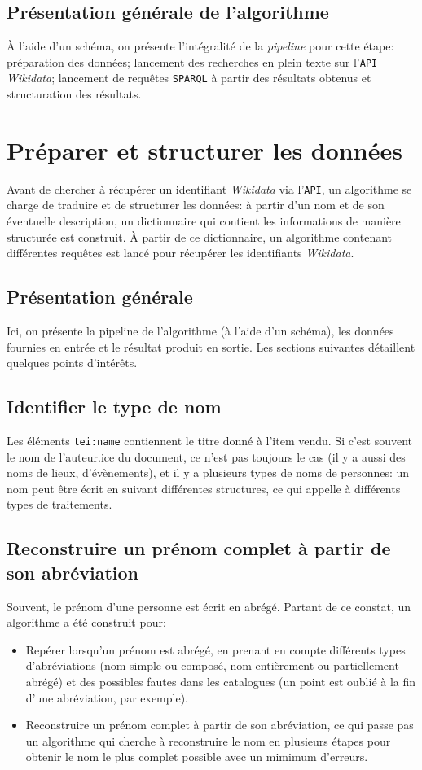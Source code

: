 \documentclass[a4paper, 12pt, twoside]{book}
\newcommand{\api}{\texttt{API}}
\newcommand{\sparql}{\texttt{SPARQL}}
\newcommand{\wkd}{\textit{Wikidata}}
\begin{document}
\subsection{Présentation générale de l'algorithme}
À l'aide d'un schéma, on présente l'intégralité de la \textit{pipeline} pour cette étape: préparation des données; lancement des recherches en plein texte sur l'\api{} \wkd{}; lancement de requêtes \sparql{} à partir des résultats obtenus et structuration des résultats. 

\section{Préparer et structurer les données}
Avant de chercher à récupérer un identifiant \wkd{} via l'\api{}, un algorithme se charge de traduire et de structurer les données: à partir d'un nom et de son éventuelle description, un dictionnaire qui contient les informations de manière structurée est construit. À partir de ce dictionnaire, un algorithme contenant différentes requêtes est lancé pour récupérer les identifiants \wkd{}.

\subsection{Présentation générale}
Ici, on présente la pipeline de l'algorithme (à l'aide d'un schéma), les données fournies en entrée et le résultat produit en sortie. Les sections suivantes détaillent quelques points d'intérêts.

\subsection{Identifier le type de nom}
Les éléments \texttt{tei:name} contiennent le titre donné à l'item vendu. Si c'est souvent le nom de l'auteur.ice du document, ce n'est pas toujours le cas (il y a aussi des noms de lieux, d'évènements), et il y a plusieurs types de noms de personnes: un nom peut être écrit en suivant différentes structures, ce qui appelle à différents types de traitements.

\subsection{Reconstruire un prénom complet à partir de son abréviation}
Souvent, le prénom d'une personne est écrit en abrégé. Partant de ce constat, un algorithme a été construit pour:
\begin{itemize}
	\item Repérer lorsqu'un prénom est abrégé, en prenant en compte différents types d'abréviations (nom simple ou composé, nom entièrement ou partiellement abrégé) et des possibles fautes dans les catalogues (un point est oublié à la fin d'une abréviation, par exemple).
	\item Reconstruire un prénom complet à partir de son abréviation, ce qui passe pas un algorithme qui cherche à reconstruire le nom en plusieurs étapes pour obtenir le nom le plus complet possible avec un mimimum d'erreurs.
\end{itemize}
\end{document}
